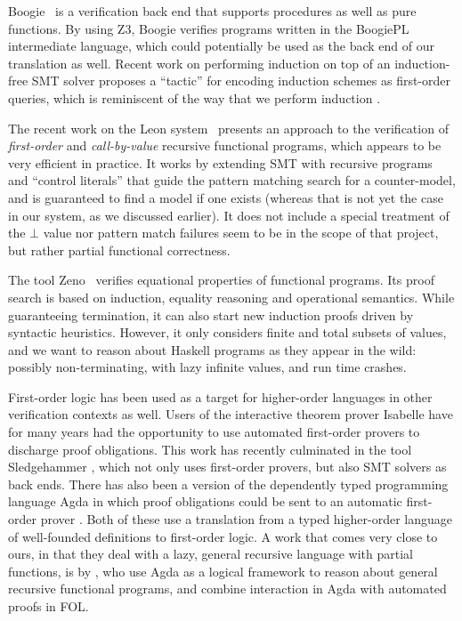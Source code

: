 Boogie~\cite{boogie} is a verification back end that supports procedures as well as
pure functions.  By using Z3, Boogie verifies
programs written in the BoogiePL intermediate language, 
which could potentially be used as the
back end of our translation as well. 
Recent work on performing induction on top of an
induction-free SMT solver proposes a ``tactic''
for encoding induction schemes as first-order queries, which is reminiscent of the way
that we perform induction \cite{Leino:2012:AIS:2189257.2189278}.

The recent work on the Leon system~\cite{Suter:2011:SMR:2041552.2041575} presents
an approach to the verification of {\em first-order} and {\em call-by-value}
recursive functional programs, which appears to be very efficient in practice.  It works
by extending SMT with recursive programs and ``control literals'' that guide the pattern
matching search for a counter-model, and is guaranteed to find a model if one exists
(whereas that is not yet the case in our system, as we discussed earlier). It
does not include a special treatment of the $\bot$ value nor pattern match failures 
seem to be in the scope of that project, but rather partial functional correctness.

The tool Zeno~\cite{zeno} verifies equational properties of functional
programs. Its proof search is based on induction, equality reasoning and 
operational semantics. While guaranteeing termination, it can also start 
new induction proofs driven by syntactic heuristics. However, it only considers 
finite and total subsets of values, and we want to reason about Haskell
programs as they appear in the wild: possibly non-terminating, with
lazy infinite values, and run time crashes.


First-order logic has been used as a target for higher-order languages
in other verification contexts as well.  Users of the interactive
theorem prover Isabelle have for many years had the opportunity to use
automated first-order provers to discharge proof obligations. This
work has recently culminated in the tool
Sledgehammer \cite{Sledgehammer}, which not only uses first-order
provers, but also SMT solvers as back ends.  There has also been a version
of the dependently typed programming language Agda in which proof
obligations could be sent to an automatic first-order
prover \cite{AgdaFOL}. Both of these use a translation from a
typed higher-order language of well-founded definitions to first-order
logic. A work that comes very close to ours, in
that they deal with a lazy, general recursive language with partial
functions, is by \citet{TypeTheoryFOL}, who use Agda as a logical
framework to reason about general recursive functional programs, and
combine interaction in Agda with automated proofs in FOL.

